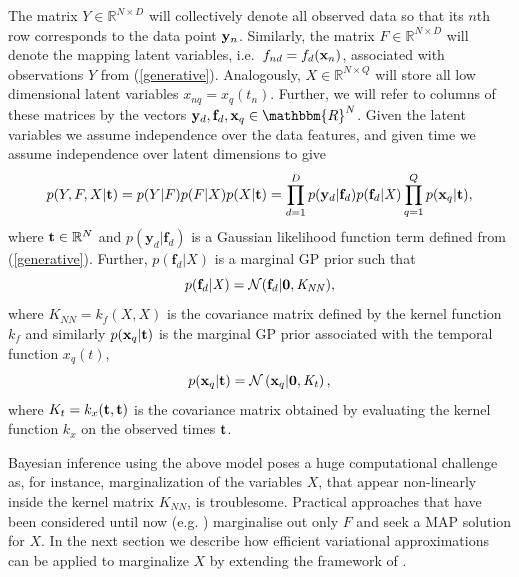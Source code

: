 \documentclass{article} %
\begin{document}
The matrix $\mathit{Y} \in \mathbb{R}^{N \times D}$ will collectively
denote all observed data so that its $n$th row corresponds to the data
point $\mathbf{y}_n$. Similarly, the matrix $F \in \mathbb{R}^{N \times D}$
will denote the mapping latent variables, i.e.\ $f_{nd} =f_d(\mathbf{x}_n)$,
associated with observations $Y$ from (\ref{generative}). Analogously,
$X \in \mathbb{R}^{N \times Q}$ will store all low dimensional latent
variables $x_{nq}=x_q(t_n)$. Further, we will refer to columns of
these matrices by the vectors $\bfy_d,\bff_d, \bfx_q \in
\mathbbm{R}^N$. Given the latent variables we assume independence over
the data features, and given time we assume independence over latent
dimensions to give
\begin{equation}
\label{joint}
p(Y,F, X | \mathbf{t}) = p(Y|F) p(F|X) p(X |\mathbf{t})= 
 \prod_{d=1}^D  p(\mathbf{y}_d | \mathbf{f}_d) p(\mathbf{f}_d |
 \mathit{X}) \prod_{q=1}^Q p(\mathbf{x}_q | \mathbf{t}),
\end{equation}
where $\mathbf{t} \in \mathbb{R}^N$ and $p(\mathbf{y}_d | \mathbf{f}_d)$ 
is a Gaussian likelihood function term defined from  (\ref{generative}). 
Further, $p(\mathbf{f}_d | \mathit{X})$ is a marginal GP prior 
such that 
\begin{equation}
\label{priorF}
p(\mathbf{f}_d | \mathit{X}) = \mathcal{N}(\mathbf{f}_d |\mathbf{0}, \mathit{K_{NN}}),
\end{equation}
where $\mathit{K}_{NN}= \mathit{k}_f(X,X)$ is the covariance matrix
defined by the kernel function $\mathit{k}_f$ and similarly 
$p(\mathbf{x}_q|\mathbf{t})$ is the marginal GP prior associated with 
the temporal function $x_q(t)$,  
\begin{equation}
p(\mathbf{x}_q|\mathbf{t}) = \mathcal{N} \left( \mathbf{x}_q | \mathbf{0},
  \mathit{K_t} \right),
\label{priorXgivenT}
\end{equation}
where $K_t = k_x(\mathbf{t},\mathbf{t})$ is the covariance matrix obtained by
evaluating the kernel function $\mathit{k}_x$ on the observed times
$\mathbf{t}$. 
 
Bayesian inference using the above model poses a huge computational
challenge as, for instance, marginalization of the variables $X$, that
appear non-linearly inside the kernel matrix $K_{NN}$, is
troublesome. Practical approaches that have been considered until now
(e.g. \cite{hgplvm, GPDM}) marginalise out only $F$ and seek a MAP
solution for $X$.
%
 In the next section we describe how efficient variational 
approximations can be applied to marginalize $X$ by extending the 
framework of \cite{BayesianGPLVM}.
\end{document}
